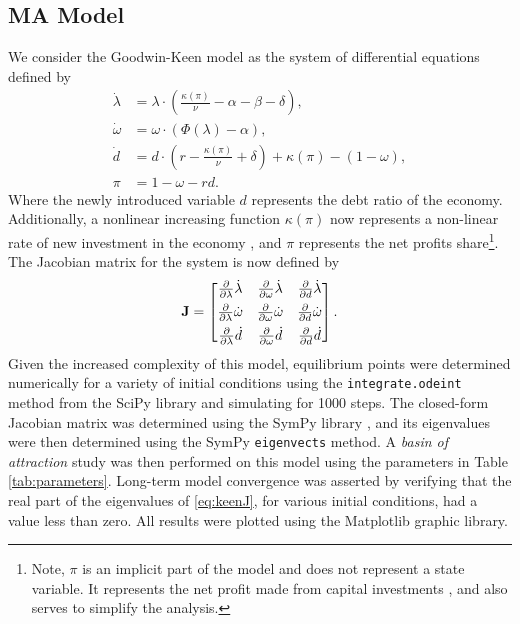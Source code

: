 \documentclass[12pt, centerh1]{article}
\begin{document}
\subsection{MA Model}
We consider the Goodwin-Keen model as the system of differential equations defined by 
\begin{equation} \label{eq:keen}
\begin{split}
    \dot{\lambda} &= \lambda \cdot \left( \frac{\kappa(\pi)}{\nu} - \alpha - \beta - \delta \right),\\
    \dot{\omega} &= \omega \cdot (\Phi(\lambda) - \alpha),\\
    \dot{d} &= d\cdot\left(r-\frac{\kappa(\pi)}{\nu}+\delta\right)+\kappa(\pi)-(1-\omega), \\
    \pi &= 1-\omega-rd.
\end{split}
\end{equation}
Where the newly introduced variable $d$ represents the debt ratio of the economy. Additionally, a nonlinear increasing function $\kappa(\pi)$ now represents a non-linear rate of new investment in the economy \citep{grasselli2012analysis}, and $\pi$ represents the net profits share\footnote{Note, $\pi$ is an implicit part of the model and does not represent a state variable. It represents the net profit made from capital investments \citep{grasselli2012analysis}, and also serves to simplify the analysis.}. The Jacobian matrix for the system is now defined by 
\begin{equation} \label{eq:keenJ}
\mathbf J =
\begin{bmatrix}
    \pdv{\lambda}\dot{\lambda} & \pdv{\omega}\dot{\lambda} & \pdv{d}\dot{\lambda}\\[1ex]
    \pdv{\lambda}\dot{\omega} & \pdv{\omega}\dot{\omega} & \pdv{d}\dot{\omega}\\[1ex]
    \pdv{\lambda}\dot{d} & \pdv{\omega}\dot{d} & \pdv{d}\dot{d}
\end{bmatrix}.
\end{equation}
Given the increased complexity of this model, equilibrium points were determined numerically for a variety of initial conditions using the \texttt{integrate.odeint} method from the SciPy library \citep{2020SciPy-NMeth} and simulating for 1000 steps. The closed-form Jacobian matrix was determined using the SymPy library \citep{SymPy}, and its eigenvalues were then determined using the SymPy \texttt{eigenvects} method. A \emph{basin of attraction} study was then performed on this model using the parameters in Table \ref{tab:parameters}. Long-term model convergence was asserted by verifying that the real part of the eigenvalues of \eqref{eq:keenJ}, for various initial conditions, had a value less than zero. All results were plotted using the Matplotlib \citep{matplotlib} graphic library.
\end{document}
